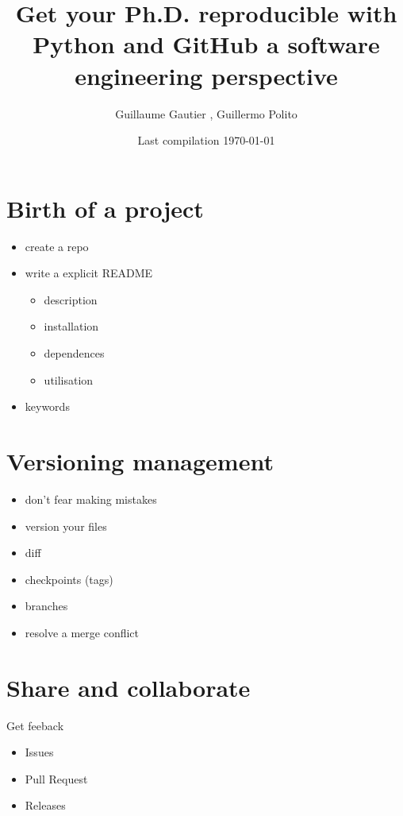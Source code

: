\documentclass{article}
\begin{document}


\title{Get your Ph.D. reproducible with Python and GitHub a software engineering perspective}

\author{Guillaume Gautier \hrefguilgautier, Guillermo Polito \hrefguillep}

\date{ Last compilation \today }

\maketitle
\tableofcontents

\clearpage
\section{Birth of a project} %
\label{sec:birth_of_a_project}
	\begin{itemize}
		\item create a repo \hrefGitHub
		\item write a explicit README
		\begin{itemize}
			\item description
	        \item installation
	        \item dependences
	        \item utilisation
		\end{itemize}
		\item keywords
	\end{itemize}

\section{Versioning management} %
\label{sec:versioning_management}
	\begin{itemize}
		\item don't fear making mistakes
		\item version your files
		\item diff
		\item checkpoints (tags)
		\item branches
		\item resolve a merge conflict
	\end{itemize}

\section{Share and collaborate} %
\label{sec:share_and_collaborate}
	Get feeback
	\begin{itemize}
		\item Issues \hrefIssues
    	\item Pull Request \hrefPullRequests
    	\item Releases \hrefReleases
	\end{itemize}
\end{document}
